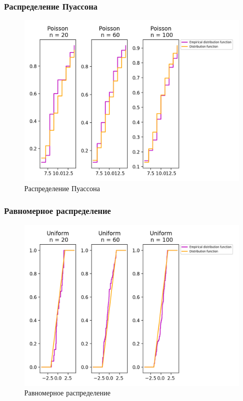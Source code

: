 \subsubsection{Распределение Пуассона}
\begin{figure}[H]
	\begin{center}
		\includegraphics[scale=0.7]{fig/Poisson_cde.png}
		\caption{Распределение Пуассона} 
		\label{pic:pic_name} 
	\end{center}
\end{figure}


\subsubsection{Равномерное распределение}
\begin{figure}[H]
	\begin{center}
		\includegraphics[scale=0.7]{fig/Uniform_cde.png}
		\caption{Равномерное распределение} 
		\label{pic:pic_name}
	\end{center}
\end{figure}



